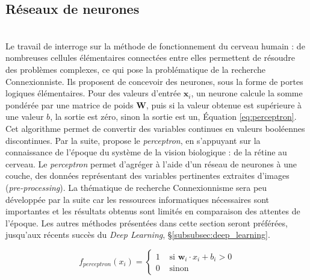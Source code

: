 \subsection{Réseaux de neurones}\mbox{} \label{parag:neural_networks} \\
Le travail de \citeauthor{mcculloch_logical_1943} \cite{mcculloch_logical_1943} interroge sur la méthode de fonctionnement du cerveau humain : de nombreuses cellules élémentaires connectées entre elles permettent de résoudre des problèmes complexes, ce qui pose la problématique de la recherche Connexionniste.
Ils proposent de concevoir des neurones, sous la forme de portes logiques élémentaires.
Pour des valeurs d'entrée $\mathbf{x}_i$, un neurone calcule la somme pondérée par une matrice de poids $\mathbf{W}$, puis si la valeur obtenue est supérieure à une valeur $b$, la sortie est zéro, sinon la sortie est un, Équation \ref{eq:perceptron}.
Cet algorithme permet de convertir des variables continues en valeurs booléennes discontinues.
Par la suite, \citeauthor{rosenblatt_perceptron_1958} \cite{rosenblatt_perceptron_1958} propose le \textit{perceptron}, en s'appuyant sur la connaissance de l'époque du système de la vision biologique : de la rétine au cerveau.
Le \textit{perceptron} permet d'agréger à l'aide d'un réseau de neurones à une couche, des données représentant des variables pertinentes extraites d'images (\textit{pre-processing}).
La thématique de recherche Connexionnisme sera peu développée par la suite car les ressources informatiques nécessaires sont importantes et les résultats obtenus sont limités en comparaison des attentes de l'époque.
Les autres méthodes présentées dans cette section seront préférées, jusqu'aux récents succès du \textit{Deep Learning}, §\ref{subsubsec:deep_learning}.

\begin{equation} \label{eq:perceptron}
f_{perceptron}(x_i)=\left\{\begin{array}{ll}{1} & {\text { si } \mathbf{w}_i \cdot x_i + b_i > 0} \\ {0} & {\text { sinon }}\end{array}\right.
\end{equation}

